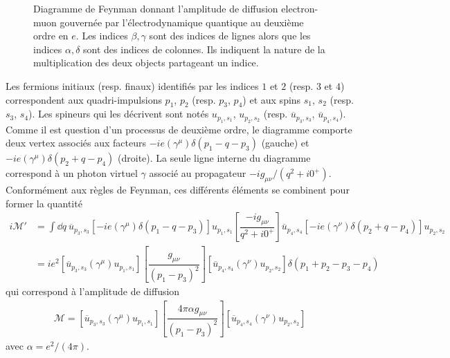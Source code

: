 {\begin{alphaparts}
\begin{figure}[h!]
    \caption{
        \footnotesize Diagramme de Feynman donnant l'amplitude de diffusion electron-muon \label{feynman} gouvernée par l'électrodynamique quantique au deuxième ordre en $e$. Les indices $\beta, \gamma$ sont des indices de lignes alors que les indices $\alpha, \delta$ sont des indices de colonnes. Ils indiquent la nature de la multiplication des deux objects partageant un indice.}
    \end{figure}
    Les fermions initiaux (resp. finaux) identifiés par les indices $1$ et $2$ (resp. $3$ et $4$) correspondent aux quadri-impulsions $p_1$, $p_2$ (resp. $p_3$, $p_4$) et aux spins $s_1$, $s_2$ (resp. $s_3$, $s_4$). Les spineurs qui les décrivent sont notés $u_{p_1, s_1}$, $u_{p_2, s_2}$ (resp. $\overline{u}_{p_3, s_3}$, $\overline{u}_{p_4, s_4}$). Comme il est question d'un processus de deuxième ordre, le diagramme comporte deux vertex associés aux facteurs $-ie (\gamma^\mu) \delta(p_1 - q - p_3)$ (gauche) et $-ie (\gamma^\mu) \delta(p_2 + q - p_4)$ (droite). La seule ligne interne du diagramme correspond à un photon virtuel $\gamma$ associé au propagateur $-i g_{\mu \nu}/(q^2 + i 0^+)$. Conformément aux règles de Feynman, ces différents éléments se combinent pour former la quantité 
    \begin{align}
        i \mathcal{M'} &= \int \dd q \ \overline{u}_{p_3, s_3} \left[-ie (\gamma^\mu) \delta(p_1 - q - p_3)\right] u_{p_1, s_1}  \left[\dfrac{-i g_{\mu \nu}}{q^2 + i 0^+}\right] \overline{u}_{p_4, s_4} \left[-ie (\gamma^\nu) \delta(p_2 + q - p_4)\right] u_{p_2, s_2}  \nonumber\\
        &=  i e^2 \left[\overline{u}_{p_3, s_3} (\gamma^\mu) u_{p_1, s_1}\right]   \left[\dfrac{g_{\mu \nu}}{(p_1 - p_3)^2}\right] \left[ \overline{u}_{p_4, s_4} (\gamma^\nu) u_{p_2, s_2} \right] \delta(p_1 + p_2 - p_3 - p_4) \nonumber 
    \end{align}
    qui correspond à l'amplitude de diffusion 
    \begin{align}
        \mathcal{M} =  \left[\overline{u}_{p_3, s_3} (\gamma^\mu) u_{p_1, s_1}\right]   \left[\dfrac{4 \pi \alpha g_{\mu \nu}}{(p_1 - p_3)^2}\right] \left[ \overline{u}_{p_4, s_4} (\gamma^\nu) u_{p_2, s_2} \right] \label{Amplitude}
    \end{align}
    avec $\alpha = e^2/(4 \pi)$.
    

\end{alphaparts}}
